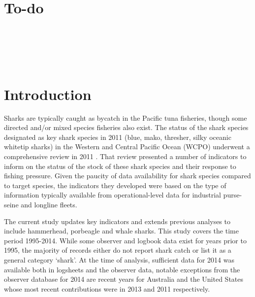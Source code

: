 \documentclass[12pt]{SCreport}
\begin{document}
\wcpfctitlepage

\tableofcontents

\section*{To-do}

\\
\\
\\
\\

\section{Introduction} %


Sharks are typically caught as bycatch in the Pacific tuna fisheries, though some directed and/or mixed species fisheries also exist. The status of the shark species designated as key shark species in 2011 (blue, mako, thresher, silky oceanic whitetip sharks) in the Western and Central Pacific Ocean (WCPO)  underwent a comprehensive review in 2011 \citep{Clarke2011_a}. That review presented a number of indicators to inform on the status of the stock of these shark species and their response to fishing pressure. Given the paucity of data availability for shark species compared to target species, the indicators they developed were based on the type of information typically available from operational-level data for industrial purse-seine and longline fleets. 

The current study updates key indicators and extends previous analyses to include hammerhead, porbeagle and whale sharks. This study covers the time period 1995-2014. While some observer and logbook data exist for years prior to 1995, the majority of records either do not report shark catch or list it as a general category `shark'.  At the time of analysis, sufficient data for 2014 was available both in logsheets and the observer data, notable exceptions from the observer database for 2014 are recent years for Australia and the United States whose most recent contributions were in 2013 and 2011 respectively.
\end{document}
